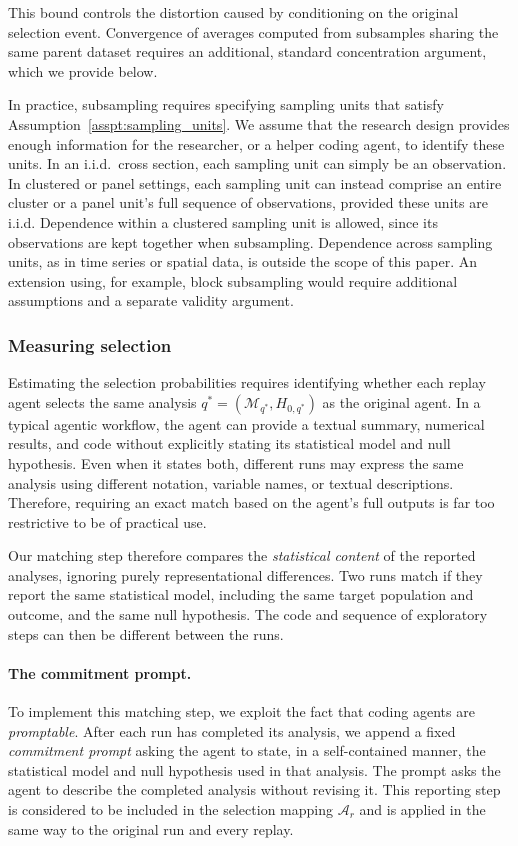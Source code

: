 \documentclass[10pt]{article}
\begin{document}
This bound controls the distortion caused by conditioning on the original selection event. Convergence of averages computed
from subsamples sharing the same parent dataset
requires an additional, standard concentration argument, which we provide below.

In practice, subsampling requires specifying sampling units that satisfy Assumption~\ref{asspt:sampling_units}. We assume that the research design provides enough information for the researcher, or a helper coding agent, to identify these units. In an i.i.d.\ cross section, each sampling unit can simply be an observation. In clustered or panel settings, each sampling unit can instead comprise an entire cluster or a panel unit's full sequence of observations, provided these units are i.i.d. Dependence within a clustered sampling unit is allowed, since its observations are kept together when subsampling. Dependence across sampling units, as in time series or spatial data, is outside the scope of this paper. An extension using, for example, block subsampling would require additional assumptions and a separate validity argument.

\subsubsection{Measuring selection}
\label{sec:equivalence}

Estimating the selection probabilities requires identifying whether each replay agent selects the same analysis $q^*=(\mathcal M_{q^*},H_{0,q^*})$ as the original agent. In a typical agentic workflow, the agent can provide a textual summary, numerical results, and code without explicitly stating its statistical model and null hypothesis. Even when it states both, different runs may express the same analysis using different notation, variable names, or textual descriptions. Therefore, requiring an exact match based on the agent's full outputs is far too restrictive to be of practical use.

Our matching step therefore compares the \emph{statistical content} of the reported analyses, ignoring purely representational differences. Two runs match if they report the same statistical model, including the same target population and outcome, and the same null hypothesis. The code and sequence of exploratory steps can then be different between the runs.

\paragraph{The commitment prompt.}
To implement this matching step, we exploit the fact that coding agents are \textit{promptable}. After each run has completed its analysis, we append a fixed \textit{commitment prompt} asking the agent to state, in a self-contained manner, the statistical model and null hypothesis used in that analysis. The prompt asks the agent to describe the completed analysis without revising it. This reporting step is considered to be included in the selection mapping $\mathcal A_r$ and is applied in the same way to the original run and every replay.
\end{document}
